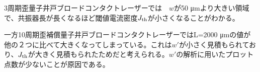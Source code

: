 3周期歪量子井戸ブロードコンタクトレーザーでは　$w$が50 \si{\micro\metre}より大きい領域で、共振器長が長くなるほど閾値電流密度$J_{\rm{th}}$が小さくなることがわかる。

一方10周期歪補償量子井戸ブロードコンタクトレーザーではL=2000 \si{\micro\metre}の値が他の２つに比べて大きくなってしまっている。これは$w'$が小さく見積もられており、$J_{\rm{th}}$が大きく見積もられたためだと考えられる。$w'$の解析に用いたプロット点数が少ないことが原因である。

\clearpage
\clearpage
